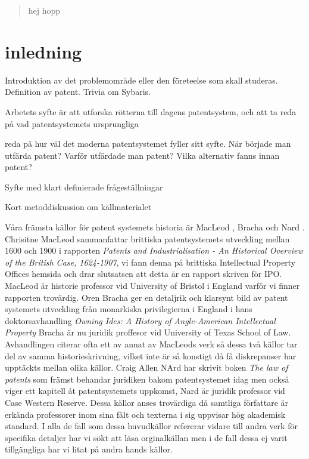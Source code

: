 
\begin{abstract}
	hej hopp
\end{abstract}	
	
	
\section{inledning}
Introduktion av det problemområde eller den företeelse som skall studeras. 
Definition av patent. Trivia om Sybaris.

Arbetets syfte är att utforska rötterna till dagens patentsystem, och att ta
reda på vad patentsystemets ursprungliga 

reda på hur väl det moderna patentsystemet fyller sitt syfte. När började man 
utfärda patent? Varför utfärdade man patent? Vilka alternativ fanns innan 
patent? 

Syfte med klart definierade frågeställningar

Kort metoddiskussion om källmaterialet

Våra främsta källor för patent systemets historia är MacLeod \cite{macleod}, Bracha \cite{bracha} och Nard
\cite{nard}. Chrisitne MacLeod sammanfattar brittiska patentsystemets utveckling mellan 1600 och 1900 i
rapporten \emph{Patents and Industrialisation - An Historical Overview of the British Case, 1624-1907}, vi
fann denna på brittiska Intellectual Property Offices hemsida och drar slutsatsen att detta är en rapport
skriven för IPO. MacLeod är historie professor vid University of Bristol i England varför vi finner
rapporten trovärdig. Oren Bracha ger en detaljrik och klarsynt bild av patent systemets utveckling från
monarkiska privilegierna i England i hans doktorsavhandling \emph{Owning Ides: A History of Angle-American
Intellectual Property} Bracha är nu juridik proffesor vid University of Texas School of Law. Avhandlingen
citerar ofta ett av annat av MacLeods verk så dessa två källor tar del av samma historieskrivning, vilket
inte är så konstigt då få diskrepanser har upptäckts mellan olika källor. Craig Allen NArd har skrivit
boken \emph{The law of patents} som främst behandar juridiken bakom patentsystemet idag men också viger ett
kapitell åt patentsystemets uppkomst, Nard är juridik professor vid Case Western Reserve. Dessa källor
anses trovärdiga då samtliga författare är erkända professorer inom sina fält och texterna i sig uppvisar
hög akademisk standard. I alla de fall som dessa huvudkällor refererar vidare till andra verk för specifika
detaljer har vi sökt att läsa orginalkällan men i de fall dessa ej varit tillgängliga har vi litat på andra
hands källor.
  

